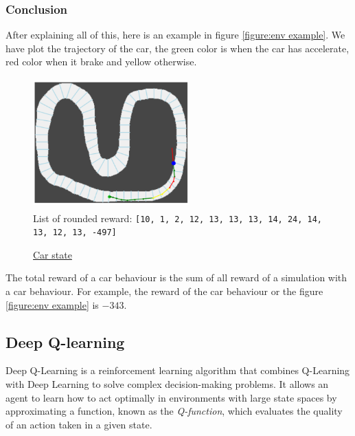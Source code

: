 \documentclass[11pt,a4paper]{article}
\newcounter{fig}
\begin{document}
			\subsubsection*{Conclusion}
After explaining all of this, here is an example in figure \ref{figure:env example}. We have plot the trajectory of the car, the green color is when the car has accelerate, red color when it brake and yellow otherwise.
\begin{center}
\label{figure:env example}
	\begin{figure}[ht]
		\centering
		\includegraphics[width=6cm, height=5cm]{env_example.png}\\
		List of rounded reward: \texttt{[10, 1, 2, 12, 13, 13, 13, 14, 24, 14, 13, 12, 13, -497]}
		\caption{\underline{Car state}}
	\end{figure}
\end{center}
The total reward of a car behaviour is the sum of all reward of a simulation with a car behaviour. For example, the reward of the car behaviour or the figure \ref{figure:env example} is $-343$.


		\subsection*{Deep Q-learning}
Deep Q-Learning is a reinforcement learning algorithm that combines Q-Learning with Deep Learning to solve complex decision-making problems. It allows an agent to learn how to act optimally in environments with large state spaces by approximating a function, known as the \textit{Q-function}, which evaluates the quality of an action taken in a given state.
    
\end{document}
